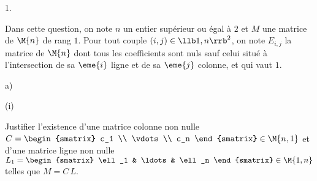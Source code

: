 \documentclass[11pt]{article}%
\begin{document}
\begin{noliste}{1.}
  \newpage


\item Dans cette question, on note $n$ un entier supérieur ou égal à
  $2$ et $M$ une matrice de $\M{n}$ de rang $1$. Pour tout couple $(i,
  j) \in \llb 1, n \rrb^2$, on note $E_{i, j}$ la matrice de $\M{n}$
  dont tous les coefficients sont nuls sauf celui situé à
  l'intersection de sa $\eme{i}$ ligne et de sa $\eme{j}$ colonne, et
  qui vaut $1$.
  \begin{noliste}{a)}
    \setlength{\itemsep}{2mm} %
  \item
    \begin{nonoliste}{(i)}
      \setlength{\itemsep}{2mm} %
    \item Justifier l'existence d'une matrice colonne non nulle $C =
      \begin{smatrix}
        c_1 \\
        \vdots \\
        c_n
      \end{smatrix}
      \in \M{n, 1}$ et d'une matrice ligne non nulle $
      L_1 = 
      \begin{smatrix}
        \ell_1 & \ldots & \ell_n
      \end{smatrix}
      \in \M{1, n}
      $ telles que $M = C \, L$.


\end{nonoliste}
\end{noliste}
\end{noliste}
\end{document}
